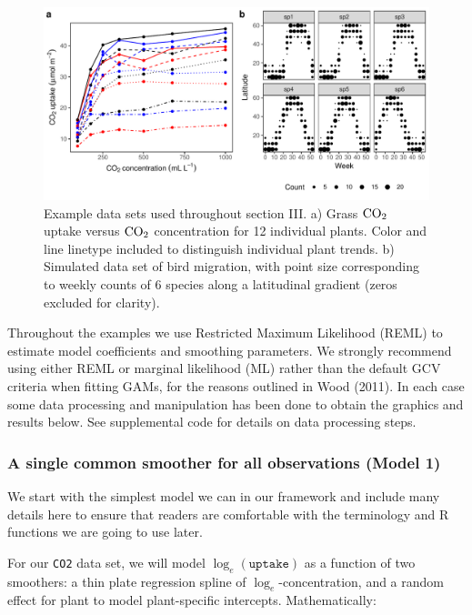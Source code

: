 \documentclass[12pt]{article}
\begin{document}
\begin{figure}
\includegraphics[width=\linewidth]{../figures/vis_data-1} \caption{\label{fig:vis_data}Example data sets used throughout section III. a) Grass $\text{CO}\textsubscript{2}$ uptake versus $\text{CO}\textsubscript{2}$ concentration for 12 individual plants. Color and line linetype included to distinguish individual plant trends. b) Simulated data set of bird migration, with point size corresponding to weekly counts of 6 species along a latitudinal gradient (zeros excluded for clarity). }\label{fig:vis_data}
\end{figure}

Throughout the examples we use Restricted Maximum Likelihood (REML) to
estimate model coefficients and smoothing parameters. We strongly
recommend using either REML or marginal likelihood (ML) rather than the
default GCV criteria when fitting GAMs, for the reasons outlined in Wood
(2011). In each case some data processing and manipulation has been done
to obtain the graphics and results below. See supplemental code for
details on data processing steps.

\subsubsection{A single common smoother for all observations (Model
1)}\label{a-single-common-smoother-for-all-observations-model-1}

We start with the simplest model we can in our framework and include
many details here to ensure that readers are comfortable with the
terminology and R functions we are going to use later.

For our \texttt{CO2} data set, we will model \(\log_e(\texttt{uptake})\)
as a function of two smoothers: a thin plate regression spline of
\(\log_e\)-concentration, and a random effect for plant to model
plant-specific intercepts. Mathematically:
\end{document}
